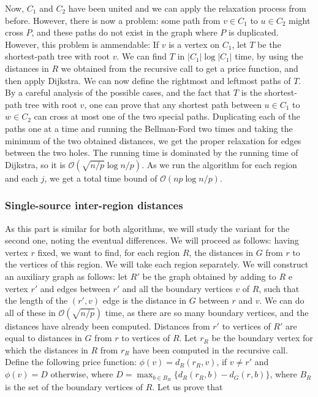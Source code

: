 \documentclass[11pt]{article}
\begin{document}
Now, $C_1$ and $C_2$ have been united and we can apply the relaxation process from before. However, there is now a problem: some path from $v\in C_1$ to $u\in C_2$ might cross $P$, and these paths do not exist in the graph where $P$ is duplicated. However, this problem is ammendable: If $v$ is a vertex on $C_1$, let $T$ be the shortest-path tree with root $v$. We can find $T$ in $|C_1|\log |C_1|$ time, by using the distances in $R$ we obtained from the recursive call to get a price function, and then apply Dijkstra. We can now define the rightmost and leftmost paths of $T$. By a careful analysis of the possible cases, and the fact that $T$ is the shortest-path tree with root $v$, one can prove that any shortest path between $u\in C_1$ to $w \in C_2$ can cross at most one of the two special paths. Duplicating each of the paths one at a time and running the Bellman-Ford two times and taking the minimum of the two obtained distances, we get the proper relaxation for edges between the two holes. The running time is dominated by the running time of Dijkstra, so it is $\mathcal{O}(\sqrt{n/p}\log n/p)$. As we run the algorithm for each region and each $j$, we get a total time bound of $\mathcal{O}(np\log n/p)$.

\subsubsection{Single-source inter-region distances}

As this part is similar for both algorithms, we will study the variant for the second one, noting the eventual differences. We will proceed as follows: having vertex $r$ fixed, we want to find, for each region $R$, the distances in $G$ from $r$ to the vertices of this region. We will take each region separately. We will construct an auxiliary graph as follows: let $R'$ be the graph obtained by adding to $R$ e vertex $r'$ and edges between $r'$ and all the boundary vertices $v$ of $R$, such that the length of the $(r',v)$ edge is the distance in $G$ between $r$ and $v$. We can do all of these in $\mathcal{O}(\sqrt{n/p})$ time, as there are so many boundary vertices, and the distances have already been computed. Distances from $r'$ to vertices of $R'$ are equal to distances in $G$ from $r$ to vertices of $R$. Let $r_R$ be the boundary vertex for which the distances in $R$ from $r_R$ have been computed in the recursive call. Define the following price function: $\phi(v) = d_R(r_R,v)$, if $v\neq r'$ and $\phi(v) = D$ otherwise, where $D = \max_{b\in B_R}\{d_R(r_R,b)-d_G(r,b)\}$, where $B_R$ is the set of the boundary vertices of $R$. Let us prove that
\end{document}
